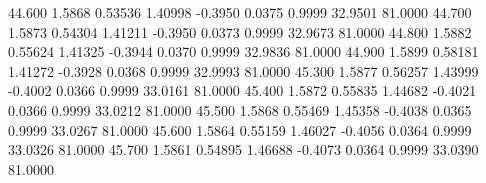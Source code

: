   44.600   1.5868   0.53536   1.40998  -0.3950   0.0375   0.9999  32.9501  81.0000
  44.700   1.5873   0.54304   1.41211  -0.3950   0.0373   0.9999  32.9673  81.0000
  44.800   1.5882   0.55624   1.41325  -0.3944   0.0370   0.9999  32.9836  81.0000
  44.900   1.5899   0.58181   1.41272  -0.3928   0.0368   0.9999  32.9993  81.0000
  45.300   1.5877   0.56257   1.43999  -0.4002   0.0366   0.9999  33.0161  81.0000
  45.400   1.5872   0.55835   1.44682  -0.4021   0.0366   0.9999  33.0212  81.0000
  45.500   1.5868   0.55469   1.45358  -0.4038   0.0365   0.9999  33.0267  81.0000
  45.600   1.5864   0.55159   1.46027  -0.4056   0.0364   0.9999  33.0326  81.0000
  45.700   1.5861   0.54895   1.46688  -0.4073   0.0364   0.9999  33.0390  81.0000

